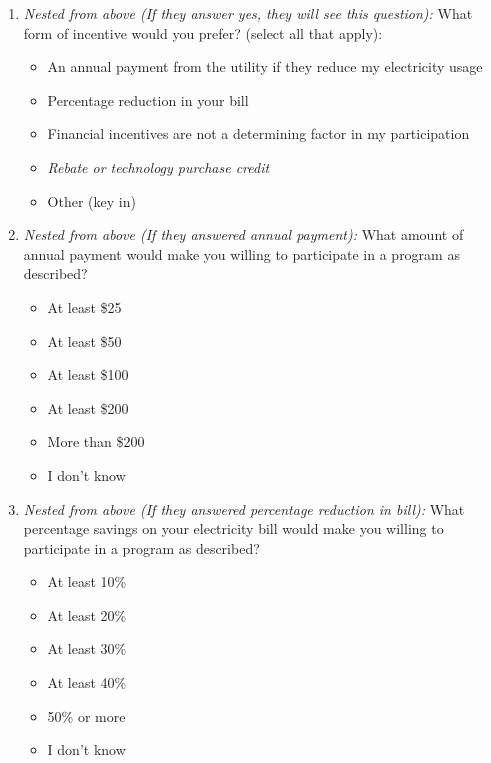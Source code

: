 \documentclass{article}
\begin{document}
\begin{enumerate}
\item \textit{Nested from above (If they answer yes, they will see this question):}
What form of incentive would you prefer? (select all that apply):
\begin{itemize}
  \item[\checkbox] An annual payment from the utility if they reduce my electricity usage
  \item[\checkbox] Percentage reduction in your bill
  \item[\checkbox] Financial incentives are not a determining factor in my participation
  \item[\checkbox] \textit{Rebate or technology purchase credit}
  \item[\checkbox] Other (key in)
\end{itemize}
 

\item \textit{Nested from above (If they answered annual payment):}
What amount of annual payment would make you willing to participate in a program as described?
\begin{itemize}
  \item[\checkbox] At least \$25
  \item[\checkbox] At least \$50
  \item[\checkbox] At least \$100
  \item[\checkbox] At least \$200
  \item[\checkbox] More than \$200
  \item[\checkbox] I don't know
\end{itemize}
 

\item \textit{Nested from above (If they answered percentage reduction in bill):}
What percentage savings on your electricity bill would make you willing to participate in a program as described?
\begin{itemize}
  \item[\checkbox] At least 10\%
  \item[\checkbox] At least 20\%
  \item[\checkbox] At least 30\%
  \item[\checkbox] At least 40\%
  \item[\checkbox] 50\% or more
  \item[\checkbox] I don't know
\end{itemize}
 


\end{enumerate}
\end{document}
